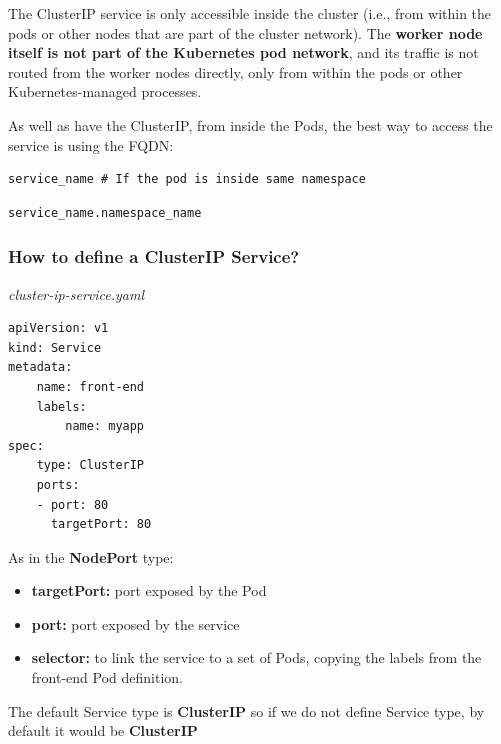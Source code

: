 \documentclass{article}
\newenvironment{blocktemplate}[1]{%
    \tcolorbox[beamer,%
    noparskip,breakable,
    colframe=Blue,%
    colbacklower=LimeGreen!75!LightGreen,%
    title=#1]}%
    {\endtcolorbox}
\newenvironment{blocktemplateI}[1]{%
    \tcolorbox[beamer,%
    noparskip,breakable,
    colframe=Violet,%
    colbacklower=Black,%
    title=#1]}%
    {\endtcolorbox}
\newenvironment{codetemplate}[1][]{%
  \mybasecolorbox[#1]
  \itshape
}{%
  \endmybasecolorbox
}
\begin{document}
The ClusterIP service is only accessible inside the cluster (i.e., from within the pods or other nodes that are part of the cluster network). The \textbf{worker node itself is not part of the Kubernetes pod network}, and its traffic is not routed from the worker nodes directly, only from within the pods or other Kubernetes-managed processes.

\begin{blocktemplate}{NOTE}
As well as have the ClusterIP, from inside the Pods, the best way to access the service is using the FQDN:
\begin{codetemplate}{}
\begin{verbatim}
service_name # If the pod is inside same namespace
\end{verbatim}
\end{codetemplate}
\begin{codetemplate}{}
\begin{verbatim}
service_name.namespace_name
\end{verbatim}
\end{codetemplate}
\end{blocktemplate}

\subsubsection{How to define a ClusterIP Service?}

\begin{codetemplate}{cluster-ip-service.yaml}
\begin{verbatim}
apiVersion: v1
kind: Service
metadata:
    name: front-end
    labels:
        name: myapp
spec:
    type: ClusterIP
    ports:
    - port: 80
      targetPort: 80
\end{verbatim}
\end{codetemplate}

As in the \textbf{NodePort} type:
\begin{itemize}
    \item \textbf{targetPort:} port exposed by the Pod
    \item \textbf{port:} port exposed by the service
    \item \textbf{selector:} to link the service to a set of Pods, copying the labels from the front-end Pod definition.
\end{itemize}

\begin{blocktemplateI}{NOTE}
The default Service type is \textbf{ClusterIP} so if we do not define Service type, by default it would be \textbf{ClusterIP}
\end{blocktemplateI}
\end{document}
